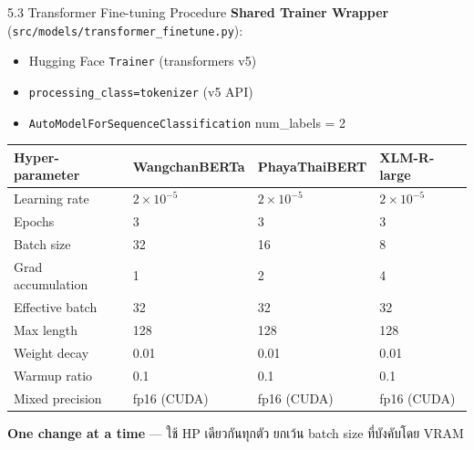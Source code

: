 \documentclass[aspectratio=169,11pt,xcolor=dvipsnames]{beamer}
\newcommand{\hl}[1]{\textcolor{kmitlOrange}{\textbf{#1}}}
\begin{document}
\begin{frame}[shrink=20]{5.3 Transformer Fine-tuning Procedure}
  \textbf{Shared Trainer Wrapper} (\texttt{src/models/transformer\_finetune.py}):
  \begin{itemize}
    \item Hugging Face \texttt{Trainer} (transformers v5)
    \item \texttt{processing\_class=tokenizer} (v5 API)
    \item \texttt{AutoModelForSequenceClassification} num\_labels = 2
  \end{itemize}
  \vspace{0.3em}
  \footnotesize
  \begin{tabular}{p{2.8cm}p{2.5cm}p{2.5cm}p{2.5cm}}
    \toprule
    \textbf{Hyper-parameter} & \textbf{WangchanBERTa} & \textbf{PhayaThaiBERT} & \textbf{XLM-R-large}\\
    \midrule
    Learning rate    & $2 \times 10^{-5}$ & $2 \times 10^{-5}$ & $2 \times 10^{-5}$\\
    Epochs           & 3 & 3 & 3\\
    Batch size       & 32 & 16 & 8\\
    Grad accumulation & 1 & 2 & 4\\
    Effective batch  & 32 & 32 & 32\\
    Max length       & 128 & 128 & 128\\
    Weight decay     & 0.01 & 0.01 & 0.01\\
    Warmup ratio     & 0.1 & 0.1 & 0.1\\
    Mixed precision  & fp16 (CUDA) & fp16 (CUDA) & fp16 (CUDA)\\
    \bottomrule
  \end{tabular}
  \vspace{0.4em}
  \begin{center}
    \scriptsize \hl{One change at a time} — ใช้ HP เดียวกันทุกตัว ยกเว้น batch size ที่บังคับโดย VRAM
  \end{center}
\end{frame}
\end{document}

